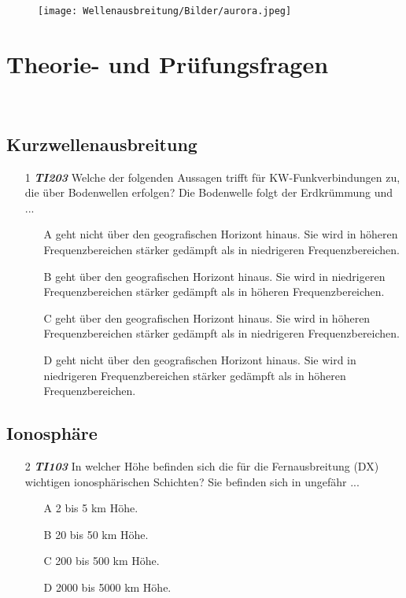 \begin{wrapfigure}[2]{r}[-1cm]{5cm}
 \vspace{-6cm}
  \texttt{[image: Wellenausbreitung/Bilder/aurora.jpeg]}
 \vspace{-6cm}
\end{wrapfigure}

\section{Theorie- und Prüfungsfragen}

~~~~~~
\subsection*{Kurzwellenausbreitung}

\begin{enumerate} 
\itemsep1pt\parskip0pt
\item[1] \emph{\textbf{TI203}}  Welche der folgenden Aussagen trifft für KW-Funkverbindungen zu, die über Bodenwellen erfolgen? Die Bodenwelle folgt der Erdkrümmung und ...
	\begin{enumerate}
	\itemsep1pt\parskip0pt
		\item[A] geht nicht über den geografischen Horizont hinaus. Sie wird in höheren Frequenzbereichen stärker gedämpft als in niedrigeren Frequenzbereichen.
		\item[B] geht über den geografischen Horizont hinaus. Sie wird in niedrigeren Frequenzbereichen stärker gedämpft als in höheren Frequenzbereichen.
		\item[C] geht über den geografischen Horizont hinaus. Sie wird in höheren Frequenzbereichen stärker gedämpft als in niedrigeren Frequenzbereichen.
		\item[D] geht nicht über den geografischen Horizont hinaus. Sie wird in niedrigeren Frequenzbereichen stärker gedämpft als in höheren Frequenzbereichen.
	\end{enumerate}
\end{enumerate}

\subsection*{Ionosphäre}

\begin{enumerate} 
\itemsep1pt\parskip0pt
\item[2] \emph{\textbf{TI103}}  In welcher Höhe befinden sich die für die Fernausbreitung (DX) wichtigen ionosphärischen Schichten? Sie befinden sich in ungefähr ...
	\begin{enumerate}
	\itemsep1pt\parskip0pt
		\item[A] 2 bis 5 km Höhe.
		\item[B] 20 bis 50 km Höhe.
		\item[C] 200 bis 500 km Höhe.
		\item[D] 2000 bis 5000 km Höhe.
	\end{enumerate}
\end{enumerate}

